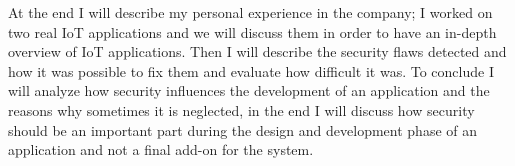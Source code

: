 	At the end I will describe my personal experience in the company; I worked on two real IoT applications and we will
	discuss them in order to have an in-depth overview of IoT applications.\newline
	Then I will describe the security flaws detected and how it was possible to fix them and evaluate how difficult it was.\newline
	To conclude I will analyze how security influences the development of an application and the reasons why sometimes it is neglected,
	in the end I will discuss how security should be an important part during the design and development phase of an application
	and not a final add-on for the system.\newline
	
	
	